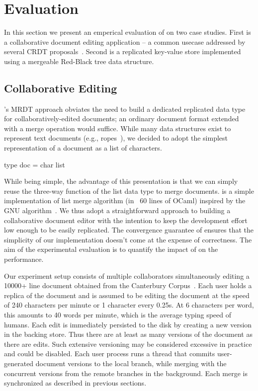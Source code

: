 \section{Evaluation}
\label{sec:eval}

In this section we present an emperical evaluation of \quark on two
case studies. First is a collaborative document editing
application -- a common usecase addressed by several CRDT
proposals~\cite{rga, treedoc, crdts}. Second is a replicated key-value
store implemented using a mergeable Red-Black tree data structure.

\subsection{Collaborative Editing}

\quark's MRDT approach obviates the need to build a dedicated
replicated data type for collaboratively-edited documents; an ordinary
document format extended with a merge operation would suffice. While
many data structures exist to represent text documents (e.g.,
ropes~\cite{boehm95}), we decided to adopt the simplest representation
of a document as a list of characters. 
\begin{center}
\begin{ocaml}
        type doc = char list
\end{ocaml}
\end{center}
While being simple, the advantage of this presentation is that we can
simply reuse the three-way  function of the list data
type to merge documents.  is a simple implementation of
list merge algorithm (in ~60 lines of OCaml) inspired by the GNU
 algorithm~\cite{gnudiff}. We thus adopt a straightforward
approach to building a collaborative document editor with the
intention to keep the development effort low enough to be easily
replicated. The convergence guarantee of \quark ensures that the
simplicity of our implementation doesn't come at the expense of
correctness. The aim of the experimental evaluation is to quantify the
impact of \quark on the performance.

Our experiment setup consists of multiple collaborators simultaneously
editing a 10000+ line document obtained from the Canterbury
Corpus~\cite{canterbury}. Each user holds a replica of the document
and is assumed to be editing the document at the speed of 240
characters per minute or 1 character every 0.25s. At 6 characters per
word, this amounts to 40 words per minute, which is the average typing
speed of humans. Each edit is immediately persisted to the disk by
creating a new version in the backing store. Thus there are at least
as many versions of the document as there are edits. Such extensive
versioning may be considered excessive in practice and could be
disabled. Each user process runs a \quark thread that commits
user-generated document versions to the local branch, while
merging with the concurrent versions from the remote branches in the
background. Each merge is synchronized as described in previous
sections.


